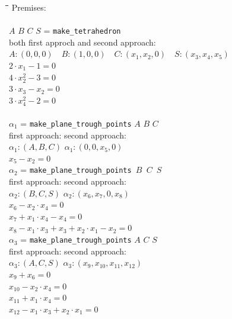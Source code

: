 \documentclass[final,1p,times,authoryear]{elsarticle}
\begin{document}
\begin{footnotesize}
\begin{tabbing}
\hspace{5mm}\=\hspace{1cm}\=\hspace{1cm}\=\hspace{6cm}\=\kill
Premises:\\
\\
\> $A$ $B$ $C$ $S$ = {\tt make\_tetrahedron} \\
  \>\> both first approch and second approach: \\
  \>\> $A: (0, 0, 0)$\ \ $B: (1, 0, 0)$\ \ $C: (x_1, x_2, 0)$\ \ $S: (x_3, x_4, x_5)$ \\
  \>\> $2\cdot x_1  - 1 = 0$ \\
  \>\> $4\cdot x_2^2  -3 = 0$ \\
  \>\> $3\cdot x_3  -  x_2 = 0$ \\
  \>\> $3\cdot x_4^2  -2 = 0$ \\ \\
\> $\alpha_1$ = {\tt make\_plane\_trough\_points} $A$ $B$ $C$ \\
\>\> first approach: \>\>second approach\footnotemark[11]: \\
 \>\> $\alpha_1: (A, B, C)$ \>\> $\alpha_1 : (0, 0, x_5, 0)$ \\
 \>\>\> \>$x_5  -  x_2 = 0$ \\
\> $\alpha_2$ = {\tt make\_plane\_trough\_points $B$ $C$ $S$} \\
\>\> first approach: \>\> second approach: \\
\>\> $\alpha_2: (B, C, S)$ \>\>$\alpha_2 : (x_6, x_7, 0, x_8)$ \\
 \>\> \>\>$x_6  -  x_2\cdot x_4 = 0$ \\
 \>\> \>\>$x_7  +  x_1\cdot x_4  -  x_4 = 0$ \\
 \>\> \>\>$x_8  -  x_1\cdot x_3  +  x_3  +  x_2\cdot x_1  -  x_2 = 0$ \\
\> $\alpha_3$ = {\tt make\_plane\_trough\_points} $A$ $C$ $S$ \\
\>\> first approach: \>\> second approach: \\
\>\> $\alpha_3: (A, C, S)$ \>\> $\alpha_3 : (x_9, x_{10}, x_{11}, x_{12})$ \\
  \>\> \>\> $x_9  +  x_6 = 0$ \\
  \>\> \>\> $x_{10}  -  x_2\cdot x_4 = 0$ \\
  \>\> \>\> $x_{11}  +  x_1\cdot x_4 = 0$ \\
  \>\> \>\> $x_{12}  -  x_1\cdot x_3  +  x_2\cdot x_1 = 0$ \\

\end{tabbing}
\end{footnotesize}
\end{document}
